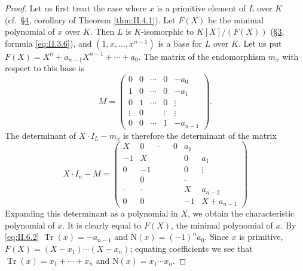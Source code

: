 \begin{proof}
Let us first treat the case where $x$ is a primitive element of $L$ over $K$
(cf.\ \hyperref[sec:2.4]{§4}, corollary of Theorem \ref{thm:II.4.1}). Let $F(X)$ be the minimal
polynomial of $x$ over $K$. Then $L$ is $K$-isomorphic to $K[X]/(F(X))$
(\hyperref[sec:2.3]{§3}, formula \eqref{eq:II.3.6}), and $(1,x,\ldots,x^{n-1})$ is a base for
$L$ over $K$. Let us put
$F(X)=X^{n}+a_{n-1}X^{n-1}+\cdots+a_{0}$. The matrix of the endomorphism
$m_{x}$ with respect to this base is
\[
M=\begin{pmatrix}
0&0&\cdots&0&-a_{0}\\
1&0&\cdots&0&-a_{1}\\
0&1&\cdots&0&\vdots\\
\vdots&0&&\vdots&\vdots\\
0&0&\cdots&1&-a_{n-1}
\end{pmatrix}.
\]
The determinant of $X\cdot I_{L}-m_{x}$ is therefore the determinant of the
matrix
\[
X\cdot I_{n}-M=\begin{pmatrix}
X&0&\cdot&&0&a_{0}\\
-1&X&&&&0&a_{1}\\
0&-1&&&&0&\vdots\\
&0&&&&\cdot\\
\cdot&\cdot&&&&X&a_{n-2}\\
0&0&&&&-1&X+a_{n-1}
\end{pmatrix}
\]
Expanding this determinant as a polynomial in $X$, we obtain the
characteristic polynomial of $x$. It is clearly equal to $F(X)$, the minimal
polynomial of $x$. By \eqref{eq:II.6.2}
$\operatorname{Tr}(x)=-a_{n-1}$ and $\mathrm{N}(x)=(-1)^{n}a_{0}$. Since $x$
is primitive, $F(X)=(X-x_{1})\cdots(X-x_{n})$; equating coefficients we see
that $\operatorname{Tr}(x)=x_{1}+\cdots+x_{n}$ and
$\mathrm{N}(x)=x_{1}\cdots x_{n}$.


\end{proof}
